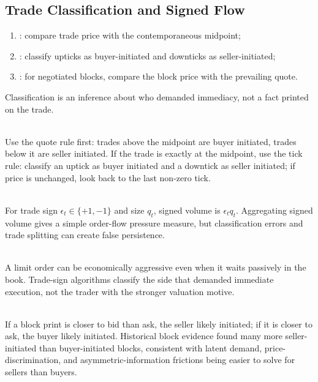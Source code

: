 \subsection{Trade Classification and Signed Flow}

\begin{taxonomy} 
\begin{enumerate}[label=\roman*.]
\setlength{\itemsep}{0pt}
\item {}: compare trade price with the contemporaneous midpoint;
\item {}: classify upticks as buyer-initiated and downticks as seller-initiated;
\item {}: for negotiated blocks, compare the block price with the prevailing quote.
\end{enumerate}
Classification is an inference about who demanded immediacy, not a fact printed on the trade.
\end{taxonomy}

\begin{method} \\
Use the quote rule first: trades above the midpoint are buyer initiated, trades below it are seller initiated. If the trade is exactly at the midpoint, use the tick rule: classify an uptick as buyer initiated and a downtick as seller initiated; if price is unchanged, look back to the last non-zero tick.
\end{method}

\begin{definition} \\
For trade sign $\epsilon_t\in\{+1,-1\}$ and size $q_t$, signed volume is $\epsilon_tq_t$. Aggregating signed volume gives a simple order-flow pressure measure, but classification errors and trade splitting can create false persistence.
\end{definition}

\begin{caveat} \\
A limit order can be economically aggressive even when it waits passively in the book. Trade-sign algorithms classify the side that demanded immediate execution, not the trader with the stronger valuation motive.
\end{caveat}

\begin{empiricalfinding} \\
If a block print is closer to bid than ask, the seller likely initiated; if it is closer to ask, the buyer likely initiated. Historical block evidence found many more seller-initiated than buyer-initiated blocks, consistent with latent demand, price-discrimination, and asymmetric-information frictions being easier to solve for sellers than buyers.
\end{empiricalfinding}
